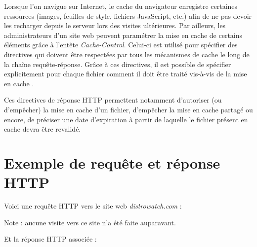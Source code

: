 Lorsque l'on navigue sur Internet, le cache du navigateur enregistre certaines ressources (images, feuilles de style, fichiers JavaScript, etc.) afin de ne pas devoir les recharger depuis le serveur lors des visites ultérieures. Par ailleurs, les administrateurs d'un site web peuvent paramétrer la mise en cache de certains éléments grâce à l'entête \textit{Cache-Control}. Celui-ci est utilisé pour spécifier des directives qui doivent être respectées par tous les mécanismes de cache le long de la chaîne requête-réponse. Grâce à ces directives, il est possible de spécifier explicitement pour chaque fichier comment il doit être traité vis-à-vis de la mise en cache \cite{IETF_RFC2616}.

Ces directives de réponse HTTP permettent notamment d'autoriser (ou d'empêcher) la mise en cache d'un fichier, d'empêcher la mise en cache partagé ou encore, de préciser une date d'expiration à partir de laquelle le fichier présent en cache devra être revalidé.


\section{Exemple de requête et réponse HTTP}
\label{http_request_example}
Voici une requête HTTP vers le site web \textit{distrowatch.com} :

\begin{singlespacing}

\end{singlespacing}
Note : aucune visite vers ce site n'a été faite auparavant.
\newline

Et la réponse HTTP associée :

